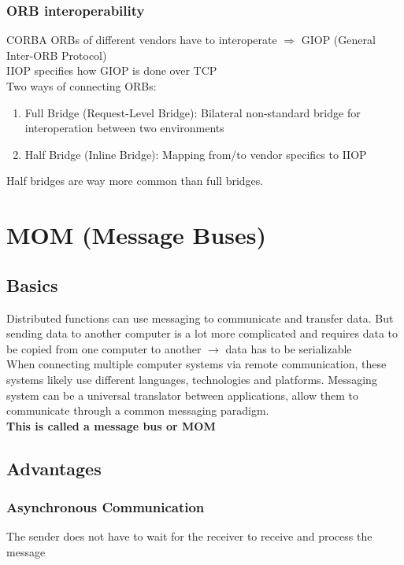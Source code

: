 			\subsubsection{ORB interoperability}
			CORBA ORBs of different vendors have to interoperate $ \Rightarrow $ GIOP (General Inter-ORB Protocol)\\
			IIOP specifies how GIOP is done over TCP\\
			Two ways of connecting ORBs: 
			\begin{enumerate}
				\item Full Bridge (Request-Level Bridge): Bilateral non-standard bridge for interoperation
				between two environments
				
				\item Half Bridge (Inline Bridge): Mapping from/to vendor specifics to IIOP
			\end{enumerate}
			Half bridges are way more common than full bridges.
			
			
			
	\section{MOM (Message Buses)}
		\subsection{Basics}
			Distributed functions can use messaging to communicate and transfer data. But sending data to another computer is a lot more complicated and requires data to be copied from one computer to another $ \rightarrow $ data has to be serializable\\
			When connecting multiple computer systems via remote communication, these systems likely use different languages, technologies and platforms. Messaging system can be a universal translator between
			applications, allow them to communicate through a common messaging paradigm.\\
			\textbf{This is called a message bus or MOM}
			
			\pagebreak %
			
		\subsection{Advantages}
			\subsubsection{Asynchronous Communication}
				The sender does not have to wait for the receiver to receive and process the message
